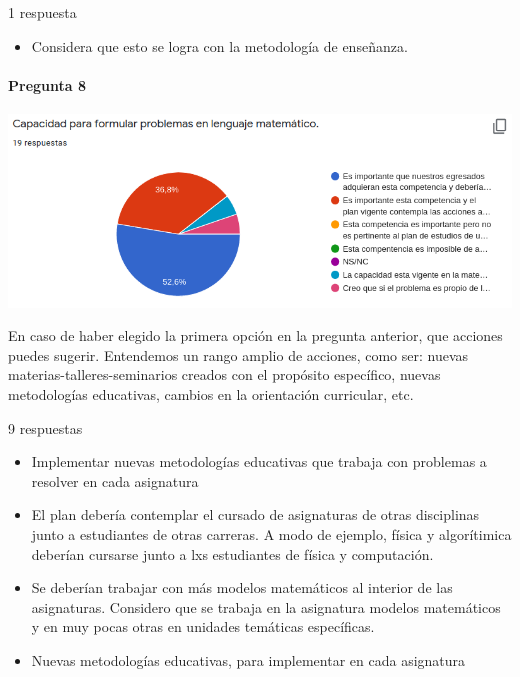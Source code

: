 \documentclass[a4paper,10pt,BCOR10mm,oneside,headsepline]{scrbook}
\begin{document}
\begin{subappendices}
 1 respuesta

 
   \begin{itemize} 
   \item Considera que esto se logra con la metodología de enseñanza.
  \end{itemize}
  
    
  \paragraph{Pregunta 8}
\begin{center}
 
\includegraphics[scale=.9]{doc08.png}
 \end{center}
  En caso de haber elegido la primera opción en la pregunta anterior, que acciones puedes sugerir. Entendemos un rango amplio de acciones, como ser: nuevas materias-talleres-seminarios creados con el propósito específico, nuevas metodologías educativas, cambios en la orientación curricular, etc. 
  
  9 respuestas
  
  
   \begin{itemize} 
\item Implementar nuevas metodologías educativas que trabaja con problemas a resolver en cada asignatura

\item El plan debería contemplar el cursado de asignaturas de otras disciplinas junto a estudiantes de otras carreras. A modo de ejemplo, física y  algorítimica deberían cursarse junto a lxs estudiantes de física y computación.

\item Se deberían trabajar con más modelos matemáticos al interior de las asignaturas. Considero que se trabaja en la asignatura modelos matemáticos y en muy pocas otras en unidades temáticas específicas. 

\item Nuevas metodologías educativas, para implementar en cada asignatura


\end{itemize}
\end{subappendices}
\end{document}
